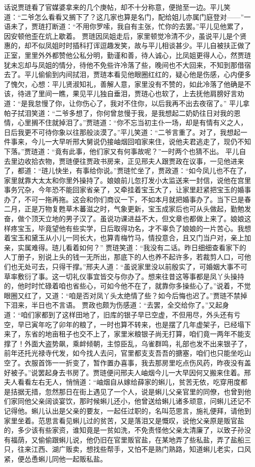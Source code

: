 \documentclass[12pt,oneside]{book}
\begin{document}
话说贾琏看了官媒婆拿来的几个庚帖，却不十分称意，便抛至一边。平儿笑道：“二爷怎么看看又搁下了？这几家也算是名门，配给姐儿亦属门庭登对——”一语未了，贾琏打断道：“不用你罗嗦，我自有主张，忙你的去罢。”平儿见他累了，因安顿他歪在炕上歇着。
贾琏因凤姐走后，家里顿觉冷清不少，虽说平儿是个贤惠的，却不似凤姐时时插科打诨逗趣发笑，故与平儿相谈甚少。平儿自被扶正做了正室，里里外外都赞他公私分明，勤谨和善，待人诚心，比凤姐更得人心，然贾琏犹未忘却与凤姐的情分，待他不免些许冷落了些，晚间也不大回来，不知到那借宿去了。平儿偷偷到内间拭泪，贾琏本看见他眼圈红红的，疑心他是伤感，心内便多了愧欠，心想：平儿贤淑知礼，善解人意，家里没有不赞的，如此冷落了他确是不该，待进了里间一瞧，果见平儿独自垂泪，贾琏心也软了，上去抚他肩膀好言劝道：“是我怠慢了你，让你伤心了，我对不住你，以后我再不出去夜宿了。”
平儿拿帕子拭泪笑道：“二爷多想了，你何曾怠慢于我，是我想起二奶奶往日对我的恩情，心里搁不住就掉泪了。”贾琏道：“你不忘当初主仆一场，却是有情有义之人，日后我更不可待你象以往那般淡漠了。”平儿笑道：“二爷言重了。对了，我想起一件事来，今儿一大早听邢大舅说仍接岫烟回咱家来住，说他夫君逃走了，现仍不知下落。”贾琏道：“竟有此事，他们家又有何事故呢？”一时两个也猜不出。
平儿自去里边收拾衣物，贾琏便往贾政书房来，正见邢夫人跟贾政在议事，一见他进来了，都道：“琏儿快坐，有事给你说。”贾琏忙坐了，贾政道：“如今凤儿也不在了，家里就靠大太太和你里外操持了。娘娘前儿忽打发小太监送来一封信，说他在宫里事务冗杂，今年恐不能回家省亲了，又牵挂着宝玉大了，让家里赶紧把宝玉的婚事办了，不可一拖再拖。这会和你们商议一下，不如本月就把婚事办了。当下已是春二月，正是万物复甦草木蕃滋之时，气象更新，宝玉成家后也可从头做起，勤勉发奋，做个顶天立地的男子汉了。虽说功课进益不大，但文章也都做上来了。娘娘这样疼宝玉，毕竟望他有些实学，日后取得功名，才不辜负了娘娘的一片苦心。我想着宝玉和黛玉从小儿一同长大，也算青梅竹马，情投意合，且又门当户对，亲上加亲，实属难得。琏儿看着如何？”
贾琏笑道：“我没有二话。昨日细细查看家下的人丁册子，别说上头的钱一无所出，那底下的人也养不起许多，若裁剪人口，可他们也无处可去，只得干撑。”邢夫人道：“虽说家里没以前殷实了，可婚姻大事不可草率敷衍了事。这一切礼仪事宜皆交与你办了。想来往昔这等事都是凤丫头操持的，他时时忙碌着咱也省些心，可如今他不在了，就靠你多操些心了。”说着，不觉眼圈又红了，又道：“咱是否对凤丫头太绝情了些？如今后悔也迟了。”贾琏不禁掉下泪来，半日也不言语。
贾政也颇为伤感道：“去罢，全交给你了。”又起身道：“咱们家都到了这样田地了，旧库的银子早已空虚，不但用尽，外头还有亏空，早已寅年吃了卯年的粮了，一时也算不转来，也是摆了几年虚架子，已经塌下来了，东省的地亩租子也交不上了，家里米粮银子尚无打算，咱们竟一两年不能支撑了！外面大盗势飙，乘衅倾朝，主惊臣乱，乌雀群鸣，礼部也发不出来银子了，前年还托光禄寺代发，如今找人去问，官里都支支吾吾的搪塞，咱们也只能坐吃山空了。衣服首饰一一折变了，暂作置办喜事，我去那房里吃点伤风药，昨夜没有盖好被子。”说罢起身去书房了。贾琏便问邢夫人岫烟今儿一大早因何又搬来住着。邢夫人看看左右无人，悄悄道：“岫烟自从嫁给薛家的蝌儿，贫苦无依，吃穿用度都是拮据无措，忽然那日在街上遇见了一个人，说是蝌儿父亲官里的同僚，也曾到他们家同他父亲阔谈宴饮，那时候蝌儿还小，他曾送给蝌儿诸多顽意，问蝌儿还记不记得他。蝌儿认出是父亲的要友，一起任过职的，名叫范思言，施礼便拜，请他到家里坐着。范思言看见蝌儿过的贫苦，又是落泪又是慨叹，说他父亲原是贩官盐的，多少该有些家资，谁知竟是一贫如洗，不免责怪他父亲太清廉了，以致子孙没有福荫，又偷偷跟蝌儿说，他仍旧在官里贩官盐，在某地弄了些私盐，弄了盐船三只，往来江西、湖广贩卖，想找些帮手，又怕不是熟门熟路，知道蝌儿老实，口风紧，便怂恿蝌儿同他一起贩私盐。
\end{document}

